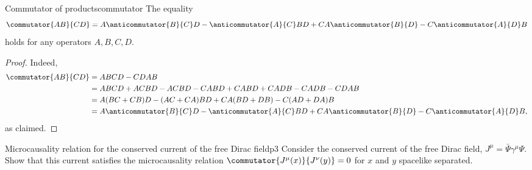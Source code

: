 \begin{lemma}{Commutator of products}{commutator}
   The equality
   \begin{equation*}
      \commutator{AB}{CD} = A\anticommutator{B}{C}D - \anticommutator{A}{C}BD + CA\anticommutator{B}{D} - C\anticommutator{A}{D}B
   \end{equation*}
   holds for any operators \(A, B, C, D.\)
\end{lemma}
\begin{proof}
    Indeed,
   \begin{align*}
      \commutator{AB}{CD} &= ABCD - CDAB\\
                          &= ABCD + ACBD - ACBD - CABD + CABD + CADB - CADB - CDAB\\
                          &= A(BC + CB)D - (AC + CA)BD + CA(BD + DB) - C(AD + DA)B\\
                          &= A\anticommutator{B}{C}D - \anticommutator{A}{C}BD + CA\anticommutator{B}{D} - C\anticommutator{A}{D}B,
   \end{align*}
   as claimed.
\end{proof}
\begin{problem}{Microcausality relation for the conserved current of the free Dirac field}{p3}
   Consider the conserved current of the free Dirac field, \(J^\mu = \bar{\Psi} \gamma^\mu \Psi.\) Show that this current satisfies the microcausality relation \(\commutator{J^\mu(x)}{J^\nu(y)} = 0\) for \(x\) and \(y\) spacelike separated.
\end{problem}
